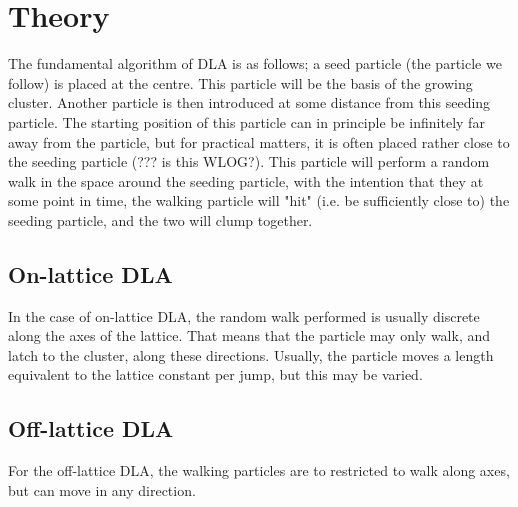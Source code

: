 \section{Theory}
The fundamental algorithm of DLA is as follows; a seed particle (the particle we follow) is placed at the centre. This particle will be the basis of the growing cluster. Another particle is then introduced at some distance from this seeding particle. The starting position of this particle can in principle be infinitely far away from the particle, but for practical matters, it is often placed rather close to the seeding particle (??? is this WLOG?). This particle will perform a random walk in the space around the seeding particle, with the intention that they at some point in time, the walking particle will "hit" (i.e. be sufficiently close to) the seeding particle, and the two will clump together. 

\subsection{On-lattice DLA}
In the case of on-lattice DLA, the random walk performed is usually discrete along the axes of the lattice. That means that the particle may only walk, and latch to the cluster, along these directions. Usually, the particle moves a length equivalent to the lattice constant per jump, but this may be varied. 

\subsection{Off-lattice DLA}
For the off-lattice DLA, the walking particles are to restricted to walk along axes, but can move in any direction. 